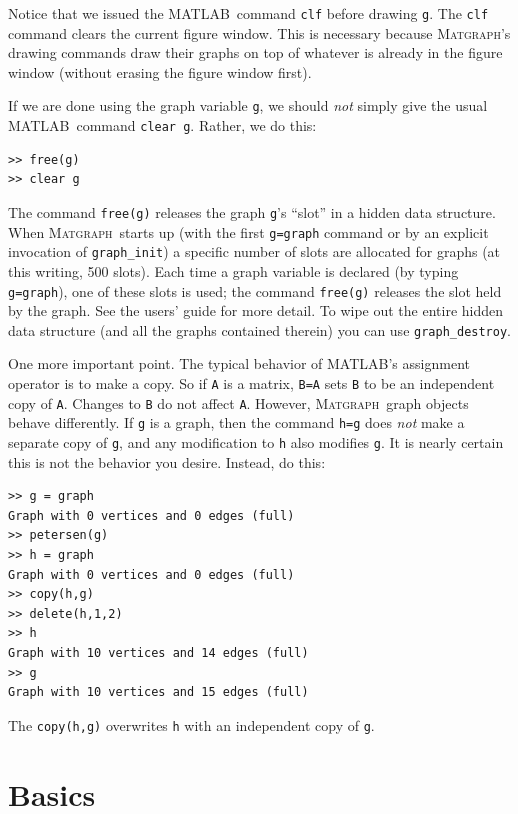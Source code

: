 \documentclass[12pt]{amsart}
\newcommand\matlab{MATLAB}
\newcommand\matgraph{\textsc{Matgraph}}
\begin{document}
Notice that we issued the \matlab\ command \verb|clf| before drawing
\verb|g|. The \verb|clf| command clears the current figure
window. This is necessary because \matgraph's drawing commands draw
their graphs on top of whatever is already in the figure window
(without erasing the figure window first). 

If we are done using the graph variable \verb|g|, we should \emph{not}
simply give the usual \matlab\ command \verb|clear g|. Rather, we do
this:
\begin{verbatim}
>> free(g)
>> clear g
\end{verbatim}
The command \verb|free(g)| releases the graph \verb|g|'s ``slot'' in a
hidden data structure. When \matgraph\ starts up (with the first
\verb|g=graph| command or by an explicit invocation of
\verb|graph_init|) a specific number of slots are allocated for graphs
(at this writing, 500 slots). Each time a graph variable is declared
(by typing \verb|g=graph|), one of these slots is used; the command
\verb|free(g)| releases the slot held by the graph. See the users'
guide for more detail. To wipe out the entire hidden data structure
(and all the graphs contained therein) you can use
\verb|graph_destroy|. 

One more important point. The typical behavior of \matlab's assignment
operator is to make a copy. So if \verb|A| is a matrix, \verb|B=A|
sets \verb|B| to be an independent copy of \verb|A|. Changes to
\verb|B| do not affect \verb|A|. However, \matgraph\ graph objects
behave differently. If \verb|g| is a graph, then the command
\verb|h=g| does \emph{not} make a separate copy of \verb|g|, and any
modification to \verb|h| also modifies \verb|g|. It is nearly certain
this is not the behavior you desire. Instead, do this:
\begin{verbatim}
>> g = graph
Graph with 0 vertices and 0 edges (full)
>> petersen(g)
>> h = graph
Graph with 0 vertices and 0 edges (full)
>> copy(h,g)
>> delete(h,1,2)
>> h
Graph with 10 vertices and 14 edges (full)
>> g
Graph with 10 vertices and 15 edges (full)
\end{verbatim}
The \verb|copy(h,g)| overwrites \verb|h| with an independent copy of
\verb|g|. 


\section{Basics}
\end{document}
